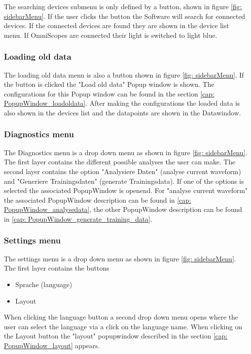 \documentclass[]{scrreprt}
\begin{document}
The searching devices submenu is only defined by a button, shown in figure \ref{fig: sidebarMenu}. If the user clicks the button the Software will search for connected devices. If the connected devices are found they are shown in the device list menu. 
If OmniScopes are connected their light is switched to light blue. 

\subsubsection{Loading old data}

The loading old data menu is also a button shown in figure \ref{fig: sidebarMenu}. If the button is clicked the "Load old data" Popup window is shown. 
The configurations for this Popup window can be found in the section \ref{cap: PopupWindow_loadoldata}.
After making the configurations the loaded data is also shown in the devices list and the datapoints are shown in the Datawindow.


\subsubsection{Diagnostics menu}

The Diagnostics menu is a drop down menu as shown in figure \ref{fig: sidebarMenu}. 
The first layer contains the different possible analyses the user can make. The second layer contains the option "Analysiere Daten" (analyse current waveform) and "Generiere Trainingsdaten" (generate Trainingsdata). If one of the options is selected the associated PopupWindow is openend.
For "analyse current waveform" the associated PopupWindow description can be found in \ref{cap: PopupWindow_analysedata}, the other PopupWindow description can be found in \ref{cap: PopupWindow_generate_training_data}.

\subsubsection{Settings menu}

The settings menu is a drop down menu as shown in figure \ref{fig: sidebarMenu}. 
The first layer contains the buttons
\begin{itemize}
    \item Sprache (language)
    \item Layout 
\end{itemize}

When clicking the language button a second drop down menu opens where the user can select the language via a click on the language name. 
When clicking on the Layout button the "layout" popupwindow described in the section \ref{cap: PopupWindow_layout} appears. 
\end{document}
